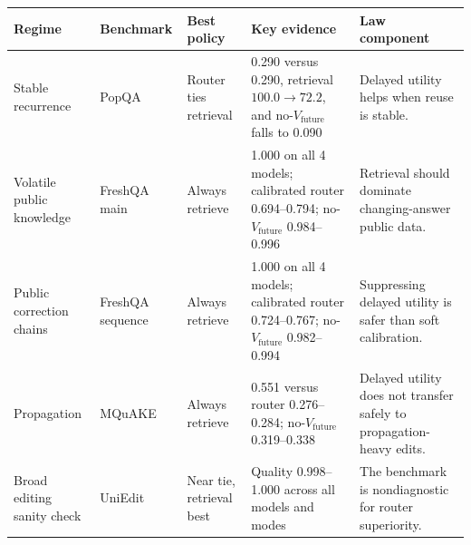 \begin{tabular}{p{1.6cm}p{1.7cm}p{1.6cm}p{3.8cm}p{2.6cm}}
\toprule
Regime & Benchmark & Best policy & Key evidence & Law component \\
\midrule
Stable recurrence & PopQA & Router ties retrieval & 0.290 versus 0.290, retrieval $100.0 \rightarrow 72.2$, and no-$V_{\mathrm{future}}$ falls to 0.090 & Delayed utility helps when reuse is stable. \\
Volatile public knowledge & FreshQA main & Always retrieve & 1.000 on all 4 models; calibrated router 0.694--0.794; no-$V_{\mathrm{future}}$ 0.984--0.996 & Retrieval should dominate changing-answer public data. \\
Public correction chains & FreshQA sequence & Always retrieve & 1.000 on all 4 models; calibrated router 0.724--0.767; no-$V_{\mathrm{future}}$ 0.982--0.994 & Suppressing delayed utility is safer than soft calibration. \\
Propagation & MQuAKE & Always retrieve & 0.551 versus router 0.276--0.284; no-$V_{\mathrm{future}}$ 0.319--0.338 & Delayed utility does not transfer safely to propagation-heavy edits. \\
Broad editing sanity check & UniEdit & Near tie, retrieval best & Quality 0.998--1.000 across all models and modes & The benchmark is nondiagnostic for router superiority. \\
\bottomrule
\end{tabular}

